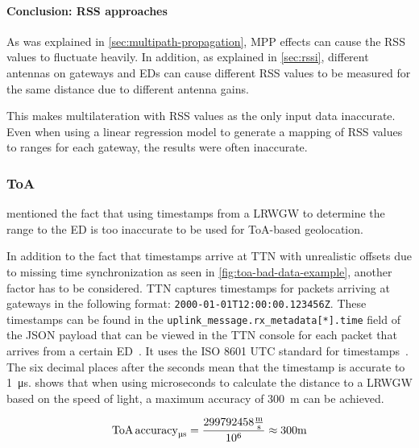 \paragraph{Conclusion: \acl{RSS} approaches}

As was explained in \cref{sec:multipath-propagation}, \acl{MPP} effects can cause the \ac{RSS} values to fluctuate heavily.
In addition, as explained in \cref{sec:rssi}, different antennas on gateways and \aclp{ED} can cause different \ac{RSS} values to be measured for the same distance due to different antenna gains.

This makes multilateration with \ac{RSS} values as the only input data inaccurate.
Even when using a linear regression model to generate a mapping of \ac{RSS} values to ranges for each gateway, the results were often inaccurate.

\subsubsection{\acl{ToA}}\label{subsec:conclusion-toa-tdoa}

 mentioned the fact that using timestamps from a \acl{LRWGW} to determine the range to the \acl{ED} is too inaccurate to be used for \ac{ToA}-based geolocation.

In addition to the fact that timestamps arrive at \ac{TTN} with unrealistic offsets due to missing time synchronization as seen in \cref{fig:toa-bad-data-example}, another factor has to be considered.
\ac{TTN} captures timestamps for packets arriving at gateways in the following format: \lstinline|2000-01-01T12:00:00.123456Z|.
These timestamps can be found in the \lstinline|uplink_message.rx_metadata[*].time| field of the \ac{JSON} payload that can be viewed in the \ac{TTN} console for each packet that arrives from a certain \acl{ED}~\cite{the_things_industries_bv_data_2023}.
It uses the \ac{ISO} 8601 \ac{UTC} standard for timestamps~\cite{newman_date_2002}.
The six decimal places after the seconds mean that the timestamp is accurate to \SI{1}{\micro\second}.
 shows that when using microseconds to calculate the distance to a \acl{LRWGW} based on the speed of light, a maximum accuracy of \SI{300}{\meter} can be achieved.

\begin{equation}\label{eq:toa-accuracy-ttn-microseconds}
    \text{ToA\,accuracy}_{\si{\micro\second}} = \frac{299792458 \frac{\si{\meter}}{\si{\second}}}{10^6} \approx 300 \si{\meter}
\end{equation}

